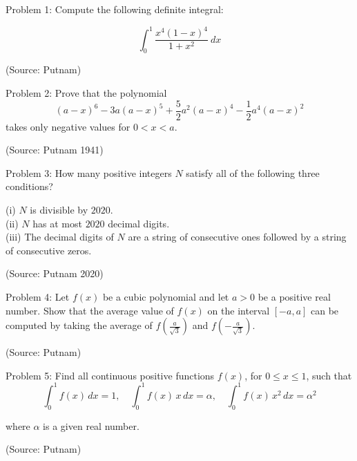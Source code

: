 Problem 1: Compute the following definite integral: 

$$\int_{0}^{1} \frac{x^4(1 - x)^4}{1 + x^2} \ dx$$

(Source: Putnam)

Problem 2: Prove that the polynomial
$$(a-x)^6 -3a(a-x)^5 +\frac{5}{2} a^2 (a-x)^4 -\frac{1}{2} a^4 (a-x)^2$$ takes only negative values for $0<x<a$.

(Source: Putnam 1941)

Problem 3: How many positive integers $N$ satisfy all of the following three conditions?

(i) $N$ is divisible by $2020$.\\
(ii) $N$ has at most $2020$ decimal digits.\\
(iii) The decimal digits of $N$ are a string of consecutive ones followed by a string of consecutive zeros.

(Source: Putnam 2020)

Problem 4: Let $f(x)$ be a cubic polynomial and let $a > 0$ be a positive real number. Show that the average value of $f(x)$ on the interval $[-a, a]$ can be computed by taking the average of $f(\frac{a}{\sqrt3})$ and $f(-\frac{a}{\sqrt3})$.

(Source: Putnam)

Problem 5: Find all continuous positive functions $f(x)$, for $0 \le x \le 1$, such that $$\int_0^1 f(x) \, dx = 1, \quad \int_0^1 f(x) \, x \, dx = \alpha, \quad \int_0^1 f(x) \, x^2 \, dx = \alpha^2$$ 

where $\alpha$ is a given real number.

(Source: Putnam)
